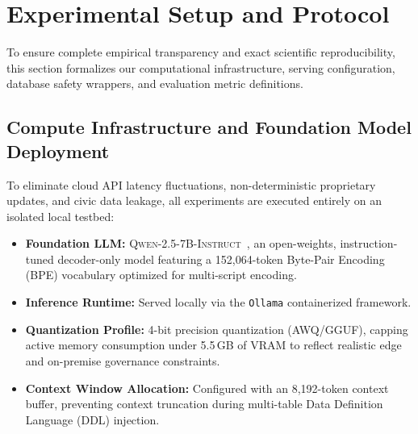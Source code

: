 \documentclass[conference]{IEEEtran}
\begin{document}
\section{Experimental Setup and Protocol}\label{sec:setup}

To ensure complete empirical transparency and exact scientific reproducibility, this section formalizes our computational infrastructure, serving configuration, database safety wrappers, and evaluation metric definitions.

\subsection{Compute Infrastructure and Foundation Model Deployment}
To eliminate cloud API latency fluctuations, non-deterministic proprietary updates, and civic data leakage, all experiments are executed entirely on an isolated local testbed:
\begin{itemize}
    \item \textbf{Foundation LLM:} \textsc{Qwen-2.5-7B-Instruct}~\cite{qwen2024qwen2.5}, an open-weights, instruction-tuned decoder-only model featuring a 152,064-token Byte-Pair Encoding (BPE) vocabulary optimized for multi-script encoding.
    \item \textbf{Inference Runtime:} Served locally via the \texttt{Ollama} containerized framework.
    \item \textbf{Quantization Profile:} 4-bit precision quantization (AWQ/GGUF), capping active memory consumption under 5.5\,GB of VRAM to reflect realistic edge and on-premise governance constraints.
    \item \textbf{Context Window Allocation:} Configured with an 8,192-token context buffer, preventing context truncation during multi-table Data Definition Language (DDL) injection.
\end{itemize}
\end{document}
